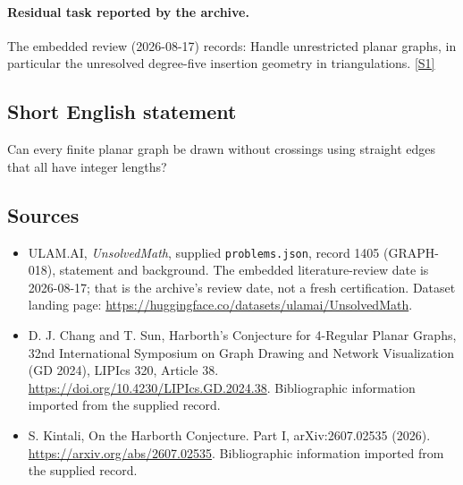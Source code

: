 \documentclass[11pt,a4paper]{article}
\newcommand{\sref}[2]{\hyperlink{source:#1:#2}{[S#2]}}
\begin{document}
\paragraph{Residual task reported by the archive.}

The embedded review (2026-08-17) records: Handle unrestricted planar graphs, in particular the unresolved degree-five insertion geometry in triangulations. \sref{1405}{1}

\subsection{Short English statement}

Can every finite planar graph be drawn without crossings using straight edges that all have integer lengths?

\subsection{Sources}

{\small

\begin{itemize}

\item[\hypertarget{source:1405:1}{S1}] ULAM.AI, \emph{UnsolvedMath}, supplied \texttt{problems.json}, record 1405 (GRAPH-018), statement and background. The embedded literature-review date is 2026-08-17; that is the archive’s review date, not a fresh certification. Dataset landing page: \url{https://huggingface.co/datasets/ulamai/UnsolvedMath}.

\item[\hypertarget{source:1405:2}{S2}] D. J. Chang and T. Sun, Harborth's Conjecture for 4-Regular Planar Graphs, 32nd International Symposium on Graph Drawing and Network Visualization (GD 2024), LIPIcs 320, Article 38. \url{https://doi.org/10.4230/LIPIcs.GD.2024.38}. Bibliographic information imported from the supplied record.

\item[\hypertarget{source:1405:3}{S3}] S. Kintali, On the Harborth Conjecture. Part I, arXiv:2607.02535 (2026). \url{https://arxiv.org/abs/2607.02535}. Bibliographic information imported from the supplied record.

\end{itemize}

}

\label{end:1405}
\end{document}
